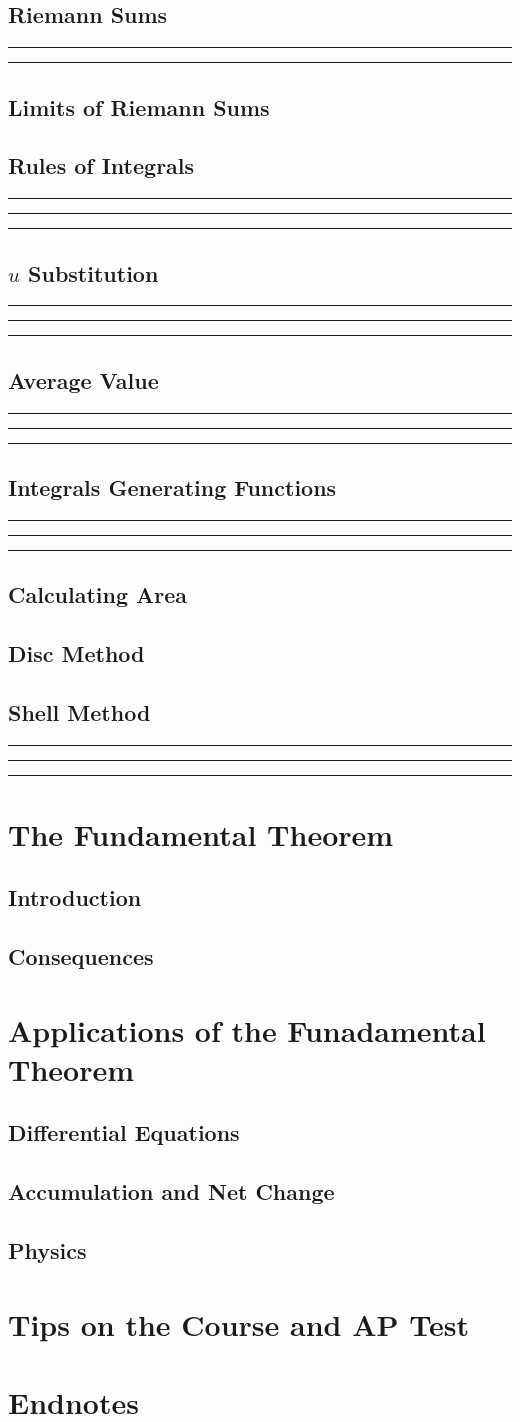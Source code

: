 \documentclass{article}
\newcommand{\newMidline}{\noindent\rule[0.5ex]{\linewidth}{1pt}}
\newcommand{\newchapter}[2]
{
	\subsection{#1}\newMidline\newMidline\newMidline\vspace{.125in}
}
\begin{document}
\subsection{Riemann Sums}\newMidline\newMidline
\subsection{Limits of Riemann Sums}
\newchapter{Rules of Integrals}{RulesOfIntegrals}
\newchapter{$u$ Substitution}{uSub}
\newchapter{Average Value}{AverageValue}
\newchapter{Integrals Generating Functions}{IntegralsGeneratingFunctions}
\subsection{Calculating Area}
\subsection{Disc Method}
\newchapter{Shell Method}{WasherMethod}
\newpage
\section{The Fundamental Theorem}
\subsection{Introduction}
\subsection{Consequences}
\newpage
\section{Applications of the Funadamental Theorem}
\subsection{Differential Equations}
\subsection{Accumulation and Net Change}
\subsection{Physics}
\newline\vfill
\newpage
\section{Tips on the Course and AP Test}\newpage
\section{Endnotes}
\end{document}
